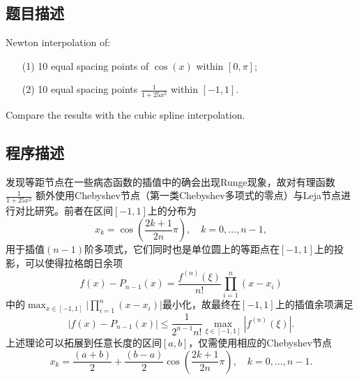 \subsection{题目描述}
\label{sec:problem_1}
\noindent Newton interpolation of:
\begin{itemize}
    \item[(1)] 10 equal spacing points of \( \cos(x) \) within \( [0, \pi] \);
    \item[(2)] 10 equal spacing points \( \frac{1}{1 + 25x^2} \) within \([-1, 1]\).
\end{itemize}
Compare the results with the cubic spline interpolation.

\subsection{程序描述}
发现等距节点在一些病态函数的插值中的确会出现Runge现象，故对有理函数\( \frac{1}{1 + 25x^2} \) 额外使用Chebyshev节点（第一类Chebyshev多项式的零点）与Leja节点进行对比研究。前者在区间\([-1, 1]\)上的分布为
\[x_k=\cos{\left(\frac{2k+1}{2n}\pi\right)},\quad k=0,\ldots,n-1,\]
用于插值\((n-1)\)阶多项式，它们同时也是单位圆上的等距点在\([-1, 1]\)上的投影，可以使得拉格朗日余项
\[f(x)-P_{n-1}(x)=\frac{f^{(n)}(\xi)}{n!}\prod_{i=1}^n(x-x_i)\]
中的\(\max_{x\in[-1,1]}\Big|\prod_{i=1}^n(x-x_i)\Big|\)最小化，故最终在\([-1, 1]\)上的插值余项满足
\[|f(x)-P_{n-1}(x)|\leq\frac1{2^{n-1}n!}\max_{\xi\in[-1,1]}\left|f^{(n)}(\xi)\right|.\]上述理论可以拓展到任意长度的区间\([a,b]\)，仅需使用相应的Chebyshev节点
\[x_k=\frac{(a+b)}2+\frac{(b-a)}2\cos\left(\frac{2k+1}{2n}\pi\right),\quad k=0,\ldots,n-1.\]

